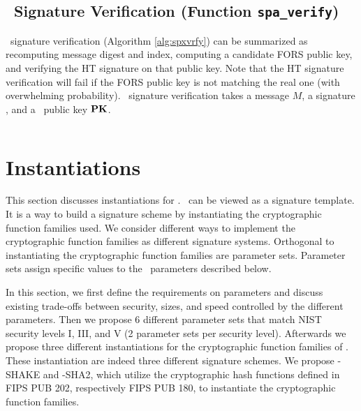 \begin{algorithm}[ht]
    \inputminted[breaklines,linenos,tabsize=2,mathescape,escapeinside=||]{C}{code/spa_sign.cs}
    \caption{ \texttt{spa\_sign} --- Generating a \SPHINCSA\ signature.}
    \label{alg:spxsign}
\end{algorithm}

\subsection{\SPHINCSA\ Signature Verification (Function \texttt{spa\_verify})}

\SPHINCSA\ signature verification (Algorithm \ref{alg:spxvrfy}) can be summarized as recomputing message digest and index, computing a candidate FORS public key, and verifying the HT signature on that public key. Note that the HT signature verification will fail if the FORS public key is not matching the real one (with overwhelming probability). \SPHINCSA\ signature verification takes a message $M$, a signature \sig, and a \SPHINCSA\ public key $\mathbf{PK}$.

\begin{algorithm}[ht]
    \inputminted[breaklines,linenos,tabsize=2,mathescape,escapeinside=||]{C}{code/spa_verify.cs}
    \caption{ \texttt{spa\_verify} --- Verify a \SPHINCSA\ signature $\bf SIG$ on a message $M$ using a \SPHINCSA\ public key $\bf PK$.}
    \label{alg:spxvrfy}
\end{algorithm}

\section{Instantiations}

This section discusses instantiations for \SPHINCSA. \SPHINCSA\ can be viewed as a signature template. It is a way to build a signature scheme by instantiating the cryptographic function families used. We consider different ways to implement the cryptographic function families as different signature systems. Orthogonal to instantiating the cryptographic function families are parameter sets. Parameter sets assign specific values to the \SPHINCSA\ parameters described below.

In this section, we first define the requirements on parameters and discuss existing trade-offs between security, sizes, and speed controlled by the different parameters. Then we propose 6 different parameter sets that match NIST security levels I, III, and V (2 parameter sets per security level). Afterwards we propose three different instantiations for the cryptographic function families of \SPHINCSA. These instantiation are indeed three different signature schemes. We propose \SPHINCSA-SHAKE and \SPHINCSA-SHA2, which utilize the cryptographic hash functions defined in FIPS PUB 202, respectively FIPS PUB 180, to instantiate the cryptographic function families.



